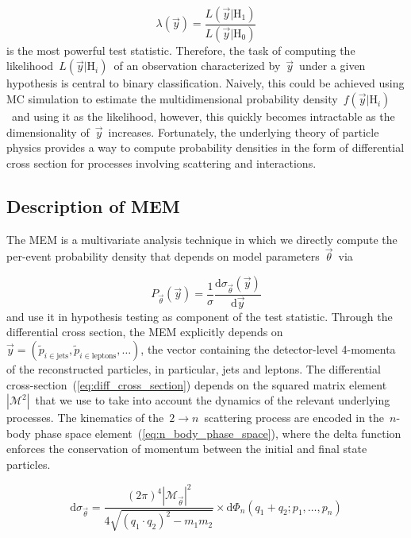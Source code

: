 \begin{equation}
\lambda(\vec{y}) = \frac{L(\vec{y}|\mathrm{H}_1)}{L(\vec{y}|\mathrm{H}_0)}
\end{equation}
is the most powerful test statistic. Therefore, the task of computing the likelihood~$L(\vec{y}|\mathrm{H}_i)$~of an observation characterized by~$\vec{y}$~under a given hypothesis is central to binary classification. Naively, this could be achieved using MC simulation to estimate the multidimensional probability density~$f(\vec{y}|\mathrm{H}_i)$~and using it as the likelihood, however, this quickly becomes intractable as the dimensionality of~$\vec{y}$~increases. Fortunately, the underlying theory of particle physics provides a way to compute probability densities in the form of differential cross section for processes involving scattering and interactions.

\subsection{Description of MEM}

The MEM is a multivariate analysis technique in which we directly compute the per-event probability density that depends on model parameters~$\vec{\theta}$~via

\begin{equation}
P_{\vec{\theta}}(\vec{y}) = \frac{1}{\sigma}
\frac{\mathrm{d}\sigma_{\vec{\theta}}(\vec{y})}{\mathrm{d}\vec{y}}
\end{equation}
and use it in hypothesis testing as component of the test statistic. Through the differential cross section, the MEM explicitly depends on~$\vec{y} = (\tilde{p}_{i \in \mathrm{jets}}, \tilde{p}_{i \in \mathrm{leptons}}, \dots)$, the vector containing the detector-level 4-momenta of the reconstructed particles, in particular, jets and leptons. The differential cross-section~(\cref{eq:diff_cross_section}) depends on the squared matrix element~$|\mathcal{M}^2|$~that we use to take into account the dynamics of the relevant underlying processes. The kinematics of the~$2 \rightarrow n$~scattering process are encoded in the~$n$-body phase space element~(\cref{eq:n_body_phase_space}), where the delta function enforces the conservation of momentum between the initial and final state particles.

\begin{equation}
\label{eq:diff_cross_section}
\mathrm{d}\sigma_{\vec{\theta}} = \frac{(2\pi)^4 |\mathcal{M}_{\vec{\theta}}|^2}{4 \sqrt{(q_1 \cdot q_2)^2 - m_1 m_2}} \times
\mathrm{d}\Phi_n(q_1 + q_2; p_1, \dots, p_{n})
\end{equation}

